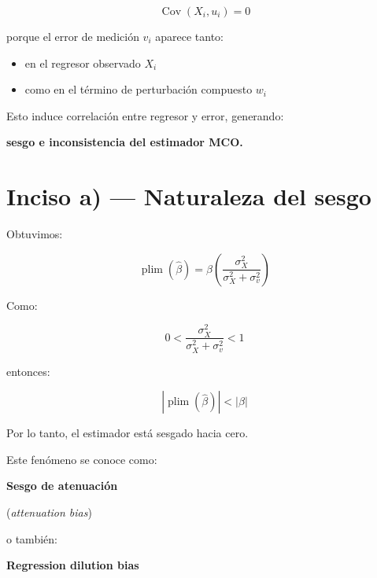 \documentclass[12pt,letterpaper]{article}
\newcommand{\Cov}{\operatorname{Cov}}
\newcommand{\plim}{\operatorname{plim}}
\begin{document}
\begin{equation}
\Cov(X_i,u_i)=0
\end{equation}

porque el error de medición $v_i$ aparece tanto:

\begin{itemize}
\item en el regresor observado $X_i$
\item como en el término de perturbación compuesto $w_i$
\end{itemize}

Esto induce correlación entre regresor y error, generando:

\begin{center}
\textbf{sesgo e inconsistencia del estimador MCO.}
\end{center}

\section{Inciso a) --- Naturaleza del sesgo}

Obtuvimos:

\begin{equation}
\plim(\hat{\beta})
=
\beta
\left(
\frac{\sigma_X^2}
{\sigma_X^2+\sigma_v^2}
\right)
\end{equation}

Como:

\begin{equation}
0<
\frac{\sigma_X^2}
{\sigma_X^2+\sigma_v^2}
<1
\end{equation}

entonces:

\begin{equation}
|\plim(\hat{\beta})|<|\beta|
\end{equation}

Por lo tanto, el estimador está sesgado hacia cero.

\begin{clave}

Este fenómeno se conoce como:

\begin{center}
\textbf{Sesgo de atenuación}
\end{center}

(\textit{attenuation bias})

o también:

\begin{center}
\textbf{Regression dilution bias}
\end{center}

\end{clave}
\end{document}
